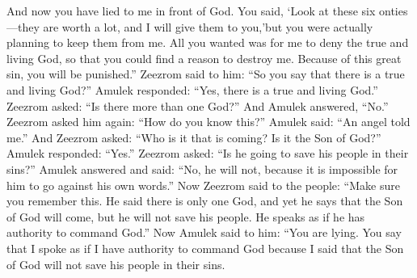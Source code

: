 And now you have lied to me in front of God. You said, \lq Look at these six onties---they are worth a lot, and I will give them to you,\rq\space but you were actually planning to keep them from me. All you wanted was for me to deny the true and living God, so that you could find a reason to destroy me. Because of this great sin, you will be punished.''
\bverse \iffalse And Zeezrom said unto him: Thou sayest there is a true and living God? \fi
Zeezrom said to him: ``So you say that there is a true and living God?''
\bverse \iffalse And Amulek said: Yea, there is a true and living God. \fi
Amulek responded: ``Yes, there is a true and living God.''
\bverse \iffalse Now Zeezrom said: Is there more than one God? \fi
Zeezrom asked: ``Is there more than one God?''
\bverse \iffalse And he answered, No. \fi
And Amulek answered, ``No.''
\bverse \iffalse Now Zeezrom said unto him again: How knowest thou these things? \fi
Zeezrom asked him again: ``How do you know this?''
\bverse \iffalse And he said: An angel hath made them known unto me. \fi
Amulek said: ``An angel told me.''
\bverse \iffalse And Zeezrom said again: Who is he that shall come? Is it the Son of God? \fi
And Zeezrom asked: ``Who is it that is coming? Is it the Son of God?''
\bverse \iffalse And he said unto him, Yea. \fi
Amulek responded: ``Yes.''
\bverse \iffalse And Zeezrom said again: Shall he save his people in their sins? And Amulek answered and said unto him: I say unto you he shall not, for it is impossible for him to deny his word. \fi
Zeezrom asked: ``Is he going to save his people in their sins?'' Amulek answered and said: ``No, he will not, because it is impossible for him to go against his own words.''
\bverse \iffalse Now Zeezrom said unto the people: See that ye remember these things; for he said there is but one God; yet he saith that the Son of God shall come, but he shall not save his people--as though he had authority to command God. \fi
Now Zeezrom said to the people: ``Make sure you remember this. He said there is only one God, and yet he says that the Son of God will come, but he will not save his people. He speaks as if he has authority to command God.''
\bverse \iffalse Now Amulek saith again unto him: Behold thou hast lied, for thou sayest that I spake as though I had authority to command God because I said he shall not save his people in their sins. \fi
Now Amulek said to him: ``You are lying. You say that I spoke as if I have authority to command God because I said that the Son of God will not save his people in their sins.
